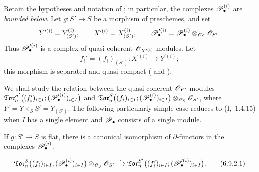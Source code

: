 \begin{env}[6.9.1]
\label{III.6.9.1}
Retain the hypotheses and notation of ; in
particular, the complexes $\mathscr{P}_\bullet^{(i)}$ are \emph{bounded below}.
Let $g:S'\to S$ be a morphism of preschemes, and set
\[
  Y^{\prime(i)}=Y_{(S')}^{(i)},
  \qquad
  X^{\prime(i)}=X_{(S')}^{(i)},
  \qquad
  \mathscr{P}_\bullet^{\prime(i)}
  =
  \mathscr{P}_\bullet^{(i)}
  \otimes_{\mathscr{O}_S}\mathscr{O}_{S'}.
\]
Thus $\mathscr{P}_\bullet^{\prime(i)}$ is a complex of quasi-coherent
$\mathscr{O}_{X^{\prime(i)}}$-modules.  Let
\[
  f_i'=(f_i)_{(S')}:
  X^{\prime(i)}\longrightarrow Y^{\prime(i)};
\]
this morphism is separated and quasi-compact
( and ).

We shall study the relation between the quasi-coherent
$\mathscr{O}_{Y'}$-modules $\mathfrak{Tor}_n^{S'}
\bigl(
(f_i')_{i\in I};
(\mathscr{P}_\bullet^{\prime(i)})_{i\in I}
\bigr)$
and $\mathfrak{Tor}_n^S
\bigl(
(f_i)_{i\in I};
(\mathscr{P}_\bullet^{(i)})_{i\in I}
\bigr)
\otimes_{\mathscr{O}_S}\mathscr{O}_{S'}$,
where $Y'=Y\times_SS'=Y_{(S')}$.
The following particularly simple case reduces to
(I,~1.4.15) when $I$ has a single element and
$\mathscr{P}_\bullet$ consists of a single module.
\end{env}

\begin{proposition}[6.9.2]
\label{III.6.9.2}
If $g:S'\to S$ is flat, there is a canonical isomorphism of
$\partial$-functors in the complexes $\mathscr{P}_\bullet^{(i)}$:
\begin{env}[6.9.2.1]
\label{III.6.9.2.1}
\[
  \mathfrak{Tor}_n^S
  \bigl(
    (f_i)_{i\in I};
    (\mathscr{P}_\bullet^{(i)})_{i\in I}
  \bigr)
  \otimes_{\mathscr{O}_S}\mathscr{O}_{S'}
  \xrightarrow{\sim}
  \mathfrak{Tor}_n^{S'}
  \bigl(
    (f_i')_{i\in I};
    (\mathscr{P}_\bullet^{\prime(i)})_{i\in I}
  \bigr).
  \tag{6.9.2.1}\label{III.6.9.2.1.eq}
\]
\end{env}
\end{proposition}

